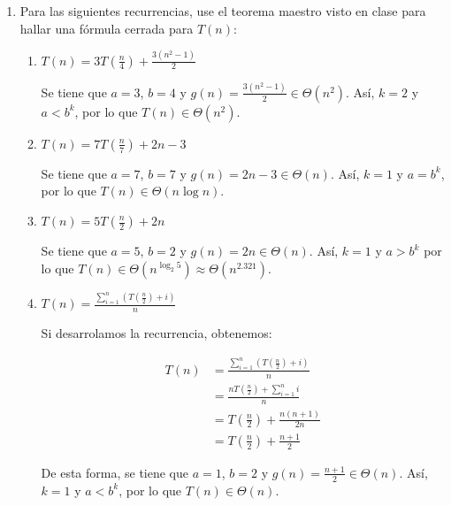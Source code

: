 \documentclass[letterpaper, 12pt]{article}
\begin{document}
\begin{enumerate}


\item Para las siguientes recurrencias, use el teorema maestro visto en clase para hallar una fórmula cerrada para $T(n)$:

\begin{enumerate}
    \item $T(n) = 3T(\frac{n}{4}) + \frac{3(n^2 - 1)}{2}$

    Se tiene que $a = 3$, $b = 4$ y $g(n) = \frac{3(n^2 - 1)}{2} \in \Theta(n^2)$. Así, $k=2$ y $a < b^k$, por lo que $T(n) \in \Theta(n^2)$. \\

    \item $T(n) = 7T(\frac{n}{7}) + 2n - 3$

    Se tiene que $a = 7$, $b = 7$ y $g(n) = 2n - 3 \in \Theta(n)$. Así, $k=1$ y $a = b^k$, por lo que $T(n) \in \Theta(n \log n)$. \\

    \item $T(n) = 5T(\frac{n}{2}) + 2n$

    Se tiene que $a = 5$, $b = 2$ y $g(n) = 2n \in \Theta(n)$. Así, $k=1$ y $a > b^k$ por lo que $T(n) \in \Theta(n^{\log_2 5}) \approx \Theta(n^{2.321})$. \\

    \item $T(n) = \frac{\sum_{i=1}^n (T(\frac{n}{2}) + i)}{n}$

    Si desarrolamos la recurrencia, obtenemos:

    \begin{align*}
        T(n) &= \frac{\sum_{i=1}^n (T(\frac{n}{2}) + i)}{n} \\
        &= \frac{nT\left(\frac{n}{2}\right) + \sum_{i=1}^n i}{n} \\
        &= T\left(\frac{n}{2}\right) + \frac{n(n+1)}{2n} \\
        &= T\left(\frac{n}{2}\right) + \frac{n+1}{2}
    \end{align*}

    De esta forma, se tiene que $a = 1$, $b = 2$ y $g(n) = \frac{n+1}{2} \in \Theta(n)$. Así, $k=1$ y $a < b^k$, por lo que $T(n) \in \Theta(n)$. \\
\end{enumerate}

\newpage


\end{enumerate}
\end{document}
